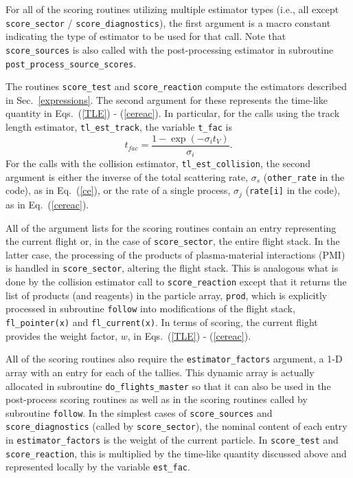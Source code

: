 \documentclass[12pt]{report}
\begin{document}
For all of the scoring routines utilizing multiple estimator
types (i.e., all except {\tt score\_sector} /
{\tt score\_diagnostics}), the first argument is a
macro constant indicating the type of estimator to be
used for that call.  Note that {\tt score\_sources} is also called
with the post-processing estimator in subroutine
{\tt post\_process\_source\_scores}.

The routines {\tt score\_test} and {\tt score\_reaction}
compute the estimators described in Sec.~\ref{expressions}.
The second argument for these represents the time-like
quantity in Eqs.~(\ref{TLE}) - (\ref{cereac}).  In
particular, for the calls using the track length estimator,
{\tt tl\_est\_track}, the variable {\tt t\_fac} is
\begin{equation}
  t_{fac} = \frac{1 - \exp(-\sigma_{i} t_{V})}{\sigma_{i}}.
\end{equation}
For the calls with the collision estimator,
{\tt tl\_est\_collision}, the second argument is either
the inverse of the total scattering rate,
$\sigma_{s}$ ({\tt other\_rate} in the code), as in
Eq.~(\ref{ce}), or the rate of a single process,
$\sigma_{j}$ ({\tt rate[i]} in the code), as in
Eq.~(\ref{cereac}).

All of the argument lists for the scoring routines contain
an entry representing the current flight or, in the
case of {\tt score\_sector}, the entire flight stack.
In the latter case, the processing of the products of
plasma-material interactions (PMI) is handled in
{\tt score\_sector}, altering the flight stack.  This
is analogous what is done by the
collision estimator call to {\tt score\_reaction}
except that it returns the list of products (and reagents)
in the particle array, {\tt prod}, which is explicitly
processed in subroutine {\tt follow} into modifications
of the flight stack, {\tt fl\_pointer(x)} and
{\tt fl\_current(x)}.  In terms of scoring, the current
flight provides the weight factor, $w$,  in
Eqs.~(\ref{TLE}) - (\ref{cereac}).

All of the scoring routines also require the
{\tt estimator\_factors} argument, a 1-D array
with an entry for each of the tallies.  This
dynamic array is actually allocated in subroutine
{\tt do\_flights\_master} so that it can also be
used in the post-process scoring routines as well
as in the scoring routines called by subroutine {\tt follow}.
In the simplest cases of {\tt score\_sources} and
{\tt score\_diagnostics} (called by {\tt score\_sector}),
the nominal content of each entry in {\tt estimator\_factors} is
the weight of the current particle.
In {\tt score\_test} and {\tt score\_reaction}, this is
multiplied by the time-like quantity discussed
above and represented locally by the variable
{\tt est\_fac}.
\end{document}
